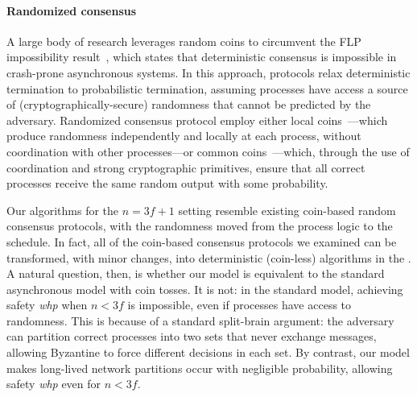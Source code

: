 \paragraph{Randomized consensus}
A large body of research leverages random coins to circumvent the FLP impossibility result~\cite{FLP}, which states that deterministic consensus is impossible in crash-prone asynchronous systems.
In this approach, protocols relax deterministic termination to probabilistic termination, assuming processes have access a source of (cryptographically-secure) randomness that cannot be predicted by the adversary. Randomized consensus protocol employ either local coins~\cite{Ben-Or83, ritas, waterbear}---which produce randomness independently and locally at each process, without coordination with other processes---or common coins~\cite{Rabin83, oracles-constantinople, signature-free, narwhal, mahimahi, bullshark}---which, through the use of coordination and strong cryptographic primitives, ensure that all correct processes receive the same random output with some probability.

Our algorithms for the $n=3f+1$ setting resemble existing coin-based random consensus protocols, with the randomness moved from the process logic to the schedule. In fact, all of the coin-based consensus protocols we examined can be transformed, with minor changes, into deterministic (coin-less) algorithms in the \model. A natural question, then, is whether our model is equivalent to the standard asynchronous model with coin tosses. It is not: in the standard model, achieving safety \textit{whp} when $n < 3f$ is impossible, even if processes have access to randomness. This is because of a standard split-brain argument: the adversary can partition correct processes into two sets that never exchange messages, allowing Byzantine to force different decisions in each set. By contrast, our model makes long-lived network partitions occur with negligible probability, allowing safety \textit{whp} even for $n<3f$.


